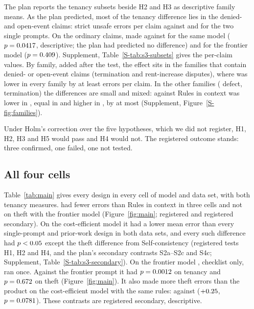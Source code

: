 The plan reports the tenancy subsets beside H2 and H3 as descriptive family means. As the plan predicted, most of the tenancy difference lies in the \sthreeClaimsDeniedOpen{} denied- and open-event claims: \sthreeHTwoDeniedOpenA{} strict unsafe errors per claim against \sthreeHTwoDeniedOpenB{} and \sthreeHThreeDeniedOpenB{} for the two single prompts. On the \sthreeClaimsOrdinary{} ordinary claims, \casepath made \sthreeHTwoOrdinaryA{} against \sthreeHTwoOrdinaryB{} for the same model ($p= 0.0417$, descriptive; the plan had predicted no difference) and \sthreeHThreeOrdinaryB{} for the frontier model ($p= 0.409$). Supplement, Table~\ref{S-tab:s3-subsets} gives the per-claim values. By family, added after the test, the effect sits in the \sthreeFFamGating{} families that contain denied- or open-event claims (termination and rent-increase disputes), where \casepath was lower in every family by at least \sthreeFFamGatingMinAbsRicFrontier{} errors per claim. In the other \sthreeFFamOther{} families (\sthreeFFamOtherDefect{} defect, \sthreeFFamOtherTermination{} termination) the differences are small and mixed: against Rules in context \casepath was lower in \sthreeFFamOtherFavourCasePathRic, equal in \sthreeFFamOtherEqualRic{} and higher in \sthreeFFamOtherFavourRic, by at most \sthreeFFamOtherMaxAbsRic{} (Supplement, Figure~\ref{S-fig:families}).

Under Holm's correction over the five hypotheses, which we did not register, H1, H2, H3 and H5 would pass and H4 would not. The registered outcome stands: three confirmed, one failed, one not tested.

\subsection{All four cells}
\label{sec:test-cells}

Table~\ref{tab:main} gives every design in every cell of model and data set, with both tenancy measures. \casepath had fewer errors than Rules in context in three cells and not on theft with the frontier model (Figure~\ref{fig:main}; registered and registered secondary). On the cost-efficient model it had a lower mean error than every single-prompt and prior-work design in both data sets, and every such difference had $p<0.05$ except the theft difference from Self-consistency (registered tests H1, H2 and H4, and the plan's secondary contrasts S2a--S2c and S4c; Supplement, Table~\ref{S-tab:s3-secondary}). On the frontier model \casepath, checklist only, ran once. Against the frontier prompt it had $p= 0.0012$ on tenancy and $p= 0.672$ on theft (Figure~\ref{fig:main}). It also made more theft errors than the product on the cost-efficient model with the same rules: \sthreeSecSevenCA{} against \sthreeSecSevenCB{} ($+0.25$, $p= 0.0781$). These contrasts are registered secondary, descriptive.

